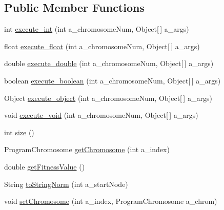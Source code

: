 \subsection*{Public Member Functions}
\begin{DoxyCompactItemize}
\item 
int \hyperlink{interfaceorg_1_1jgap_1_1gp_1_1_i_g_p_program_a61921eb5f86f89d479f3633f18dcea23}{execute\-\_\-int} (int a\-\_\-chromosome\-Num, Object\mbox{[}$\,$\mbox{]} a\-\_\-args)
\item 
float \hyperlink{interfaceorg_1_1jgap_1_1gp_1_1_i_g_p_program_a52e909e6d1d0e322fa92ce84ff58626c}{execute\-\_\-float} (int a\-\_\-chromosome\-Num, Object\mbox{[}$\,$\mbox{]} a\-\_\-args)
\item 
double \hyperlink{interfaceorg_1_1jgap_1_1gp_1_1_i_g_p_program_a5288f2f88fef5992c1f97aa5479def20}{execute\-\_\-double} (int a\-\_\-chromosome\-Num, Object\mbox{[}$\,$\mbox{]} a\-\_\-args)
\item 
boolean \hyperlink{interfaceorg_1_1jgap_1_1gp_1_1_i_g_p_program_a356d62b08aafb9fcb1cc90832e9a64c1}{execute\-\_\-boolean} (int a\-\_\-chromosome\-Num, Object\mbox{[}$\,$\mbox{]} a\-\_\-args)
\item 
Object \hyperlink{interfaceorg_1_1jgap_1_1gp_1_1_i_g_p_program_a0af6f3c0ed6fb8011a44272632c26ab2}{execute\-\_\-object} (int a\-\_\-chromosome\-Num, Object\mbox{[}$\,$\mbox{]} a\-\_\-args)
\item 
void \hyperlink{interfaceorg_1_1jgap_1_1gp_1_1_i_g_p_program_a5130121e7bda2b3b38627943846bfb6f}{execute\-\_\-void} (int a\-\_\-chromosome\-Num, Object\mbox{[}$\,$\mbox{]} a\-\_\-args)
\item 
int \hyperlink{interfaceorg_1_1jgap_1_1gp_1_1_i_g_p_program_ac4d5977f9e68517d20eb1d810f58bac3}{size} ()
\item 
Program\-Chromosome \hyperlink{interfaceorg_1_1jgap_1_1gp_1_1_i_g_p_program_a79007ec93261e4f49223e4e39bd1a924}{get\-Chromosome} (int a\-\_\-index)
\item 
double \hyperlink{interfaceorg_1_1jgap_1_1gp_1_1_i_g_p_program_a0ea406704b2bd818623ced90be07304a}{get\-Fitness\-Value} ()
\item 
String \hyperlink{interfaceorg_1_1jgap_1_1gp_1_1_i_g_p_program_a316ab62cde57da6ffa6ac78f0876fc03}{to\-String\-Norm} (int a\-\_\-start\-Node)
\item 
void \hyperlink{interfaceorg_1_1jgap_1_1gp_1_1_i_g_p_program_a21317711fdc6ed56ad22a30e7e8e8d92}{set\-Chromosome} (int a\-\_\-index, Program\-Chromosome a\-\_\-chrom)
\item 

\end{DoxyCompactItemize}

